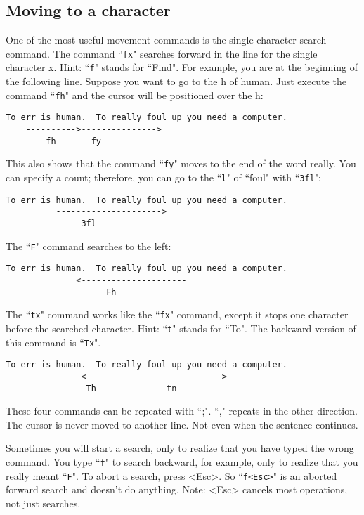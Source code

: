 \subsection{Moving to a character}
One of the most useful movement commands is the single-character search command.
The command ``\texttt{fx}" searches forward in the line for the single character x.
Hint: ``\texttt{f}" stands for ``Find".
For example, you are at the beginning of the following line.
Suppose you want to go to the h of human.
Just execute the command ``\texttt{fh}" and the cursor will be positioned over the h:

		\begin{Verbatim}[samepage=true]
    To err is human.  To really foul up you need a computer.
    ---------->--------------->
        fh       fy
		\end{Verbatim}

This also shows that the command ``\texttt{fy}" moves to the end of the word really.
You can specify a count; therefore, you can go to the ``\texttt{l}" of ``foul" with ``\texttt{3fl}":

		\begin{Verbatim}[samepage=true]
    To err is human.  To really foul up you need a computer.
          --------------------->
               3fl
		\end{Verbatim}

The ``\texttt{F}" command searches to the left:

		\begin{Verbatim}[samepage=true]
    To err is human.  To really foul up you need a computer.
              <---------------------
                    Fh
		\end{Verbatim}

The ``\texttt{tx}" command works like the ``\texttt{fx}" command, except it stops one character before the searched character.
Hint: ``\texttt{t}" stands for ``To".
The backward version of this command is ``\texttt{Tx}".

		\begin{Verbatim}[samepage=true]
    To err is human.  To really foul up you need a computer.
               <------------  ------------->
                Th              tn
		\end{Verbatim}

These four commands can be repeated with ``;".
``," repeats in the other direction.
The cursor is never moved to another line.
Not even when the sentence continues.

Sometimes you will start a search, only to realize that you have typed the wrong command.
You type ``\texttt{f}" to search backward, for example, only to realize that you really meant ``\texttt{F}".
To abort a search, press <Esc>.
So ``\texttt{f<Esc>}" is an aborted forward search and doesn't do anything.
Note: <Esc> cancels most operations, not just searches.

